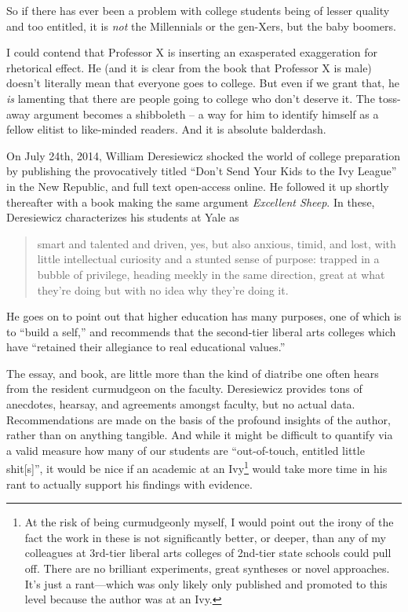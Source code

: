 So if there has ever been a problem with college students being of lesser quality and too entitled, it is \emph{not} the Millennials or the gen-Xers, but the baby boomers. 

I could contend that Professor X is inserting an exasperated exaggeration for rhetorical effect. He (and it is clear from the book that Professor X is male) doesn't literally mean that everyone goes to college. But even if we grant that, he \emph{is} lamenting that there are people going to college who don't deserve it. The toss-away argument becomes a shibboleth – a way for him to identify himself as a fellow elitist to like-minded readers. And it is absolute balderdash.

On July 24th, 2014, William Deresiewicz shocked the world of college preparation by publishing the provocatively titled ``Don't Send Your Kids to the Ivy League'' in the New Republic, and full text open-access online. He followed it up shortly thereafter with a book making the same argument \emph{Excellent Sheep}. In these, Deresiewicz characterizes his students at Yale as 

\begin{quote}

smart and talented and driven, yes, but also anxious, timid, and lost, with little intellectual curiosity and a stunted sense of purpose: trapped in a bubble of privilege, heading meekly in the same direction, great at what they're doing but with no idea why they're doing it.
\end{quote}

He goes on to point out that higher education has many purposes, one of which is to ``build a self,'' and recommends that the second-tier liberal arts colleges which have ``retained their allegiance to real educational values.'' 

The essay, and book, are little more than the kind of diatribe one often hears from the resident curmudgeon on the faculty. Deresiewicz provides tons of anecdotes, hearsay, and agreements amongst faculty, but no actual data. Recommendations are made on the basis of the profound insights of the author, rather than on anything tangible. And while it might be difficult to quantify via a valid measure how many of our students are ``out-of-touch, entitled little shit[s]'', it would be nice if an academic at an Ivy\footnote{At the risk of being curmudgeonly myself, I would point out the irony of the fact the work in these is not significantly better, or deeper, than any of my colleagues at 3rd-tier liberal arts colleges of 2nd-tier state schools could pull off. There are no brilliant experiments, great syntheses or novel approaches. It's just a rant---which was only likely only published and promoted to this level because the author was at an Ivy.} would take more time in his rant to actually support his findings with evidence.

